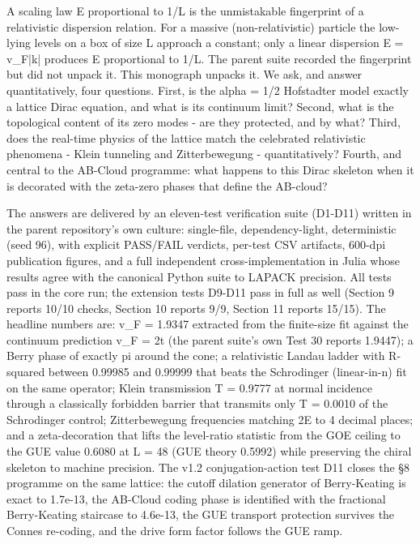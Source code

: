 \documentclass[11pt,a4paper]{article}
\begin{document}
A scaling law E proportional to 1/L is the unmistakable fingerprint of a relativistic dispersion relation. For a massive (non-relativistic) particle the low-lying levels on a box of size L approach a constant; only a linear dispersion E = v\_\allowbreak{}F|k| produces E proportional to 1/L. The parent suite recorded the fingerprint but did not unpack it. This monograph unpacks it. We ask, and answer quantitatively, four questions. First, is the alpha = 1/2 Hofstadter model exactly a lattice Dirac equation, and what is its continuum limit? Second, what is the topological content of its zero modes - are they protected, and by what? Third, does the real-time physics of the lattice match the celebrated relativistic phenomena - Klein tunneling and Zitterbewegung - quantitatively? Fourth, and central to the AB-Cloud programme: what happens to this Dirac skeleton when it is decorated with the zeta-zero phases that define the AB-cloud?

The answers are delivered by an eleven-test verification suite (D1-D11) written in the parent repository's own culture: single-file, dependency-light, deterministic (seed 96), with explicit PASS/FAIL verdicts, per-test CSV artifacts, 600-dpi publication figures, and a full independent cross-implementation in Julia whose results agree with the canonical Python suite to LAPACK precision. All tests pass in the core run; the extension tests D9-D11 pass in full as well (Section 9 reports 10/10 checks, Section 10 reports 9/9, Section 11 reports 15/15). The headline numbers are: v\_\allowbreak{}F = 1.9347 extracted from the finite-size fit against the continuum prediction v\_\allowbreak{}F = 2t (the parent suite's own Test 30 reports 1.9447); a Berry phase of exactly pi around the cone; a relativistic Landau ladder with R-squared between 0.99985 and 0.99999 that beats the Schrodinger (linear-in-n) fit on the same operator; Klein transmission T = 0.9777 at normal incidence through a classically forbidden barrier that transmits only T = 0.0010 of the Schrodinger control; Zitterbewegung frequencies matching 2E to 4 decimal places; and a zeta-decoration that lifts the level-ratio statistic from the GOE ceiling to the GUE value 0.6080 at L = 48 (GUE theory 0.5992) while preserving the chiral skeleton to machine precision. The v1.2 conjugation-action test D11 closes the \S{}8 programme on the same lattice: the cutoff dilation generator of Berry-Keating is exact to 1.7e-13, the AB-Cloud coding phase is identified with the fractional Berry-Keating staircase to 4.6e-13, the GUE transport protection survives the Connes re-coding, and the drive form factor follows the GUE ramp.
\end{document}
